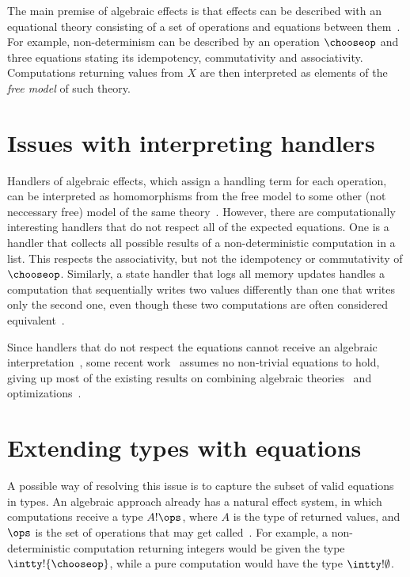 \documentclass[a4paper,UKenglish]{dagrep}
\begin{document}
The main premise of algebraic effects is that effects can be described with an equational theory consisting of a set of operations and equations between them~\cite{DBLP:journals/acs/PlotkinP03}. For example, non-determinism can be described by an operation $\chooseop$ and three equations stating its idempotency, commutativity and associativity. Computations returning values from $X$ are then interpreted as elements of the \emph{free model} of such theory.

\section{Issues with interpreting handlers}

Handlers of algebraic effects, which assign a handling term for each operation, can be interpreted as homomorphisms from the free model to some other (not neccessary free) model of the same theory~\cite{DBLP:journals/corr/PlotkinP13}. However, there are computationally interesting handlers that do not respect all of the expected equations. One is a handler that collects all possible results of a non-deterministic computation in a list. This respects the associativity, but not the idempotency or commutativity of $\chooseop$. Similarly, a state handler that logs all memory updates handles a computation that sequentially writes two values differently than one that writes only the second one, even though these two computations are often considered equivalent~\cite{DBLP:conf/fossacs/PlotkinP02}.

Since handlers that do not respect the equations cannot receive an algebraic interpretation~\cite{DBLP:journals/corr/PlotkinP13}, some recent work~\cite{DBLP:journals/corr/BauerP13,DBLP:conf/icfp/KammarLO13} assumes no non-trivial equations to hold, giving up most of the existing results on combining algebraic theories~\cite{DBLP:journals/tcs/HylandPP06} and optimizations~\cite{DBLP:conf/popl/KammarP12}.

\section{Extending types with equations}

A possible way of resolving this issue is to capture the subset of valid equations in types. An algebraic approach already has a natural effect system, in which computations receive a type $A ! \ops$, where $A$ is the type of returned values, and $\ops$ is the set of operations that may get called~\cite{DBLP:journals/corr/BauerP13,DBLP:conf/icfp/KammarLO13}. For example, a non-deterministic computation returning integers would be given the type $\intty ! \{ \chooseop \}$, while a pure computation would have the type $\intty ! \emptyset$.
\end{document}
